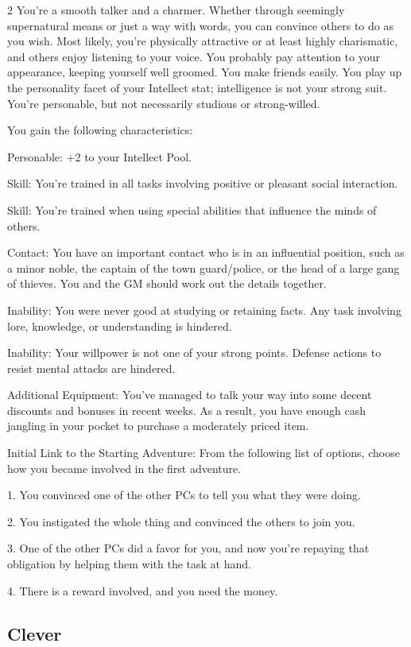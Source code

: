 \begin{multicols}{2}
You’re a smooth talker and a charmer. Whether through seemingly supernatural means or just a way with words, you can convince others to do as you wish. Most likely, you’re physically attractive or at least highly charismatic, and others enjoy listening to your voice. You probably pay attention to your appearance, keeping yourself well groomed. You make friends easily. You play up the personality facet of your Intellect stat; intelligence is not your strong suit. You’re personable, but not necessarily studious or strong-willed.

You gain the following characteristics:

Personable: +2 to your Intellect Pool.

Skill: You’re trained in all tasks involving positive or pleasant social interaction.

Skill: You’re trained when using special abilities that influence the minds of others.

Contact: You have an important contact who is in an influential position, such as a minor noble, the captain of the town guard/police, or the head of a large gang of thieves. You and the GM should work out the details together.

Inability: You were never good at studying or retaining facts. Any task involving lore, knowledge, or understanding is hindered.

Inability: Your willpower is not one of your strong points. Defense actions to resist mental attacks are hindered.

Additional Equipment: You’ve managed to talk your way into some decent discounts and bonuses in recent weeks. As a result, you have enough cash jangling in your pocket to purchase a moderately priced item.

Initial Link to the Starting Adventure: From the following list of options, choose how you became involved in the first adventure.

1. You convinced one of the other PCs to tell you what they were doing.

2. You instigated the whole thing and convinced the others to join you.

3. One of the other PCs did a favor for you, and now you’re repaying that obligation by helping them with the task at hand.

4. There is a reward involved, and you need the money.

\subsection{Clever}


\end{multicols}
